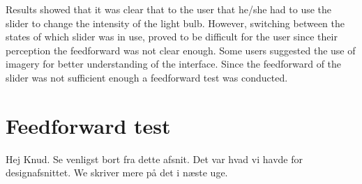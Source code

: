 Results showed that it was clear that to the user that he/she had to use the slider to change the intensity of the light bulb. However, switching between the states of which slider was in use, proved to be difficult for the user since their perception the feedforward was not clear enough. Some users suggested the use of imagery for better understanding of the interface.
Since the feedforward of the slider was not sufficient enough a feedforward test was conducted.

\section{Feedforward test}
Hej Knud. Se venligst bort fra dette afsnit. Det var hvad vi havde for designafsnittet. We skriver mere på det i næste uge.





